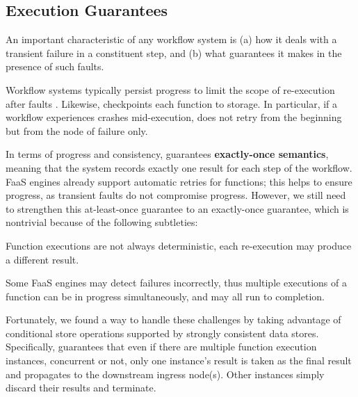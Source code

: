 \subsection{Execution Guarantees}\label{sec:exec-gntee}

An important characteristic of any workflow system is (a) how it deals with  a
transient failure in a constituent step, and (b) what guarantees it makes in
the presence of such faults.
 
Workflow systems typically persist progress to limit the scope of re-execution after faults
\cite{aws-step-functions, durable-functions, netherite, google-workflows, kappa}.
Likewise, \name{} checkpoints each function to storage.
 In particular, if a workflow experiences crashes mid-execution,
\name{} does not retry from the beginning but from the node of failure only.

In terms of progress and consistency, \name{} guarantees \textbf{exactly-once semantics}, 
meaning that the system records
exactly one result for each step of the workflow. FaaS engines already
support automatic retries for functions; this helps to ensure progress, as transient
faults do not compromise progress. However, we still need to
strengthen this at-least-once guarantee to an exactly-once guarantee, which 
is nontrivial because of the following subtleties:

\squishlist
	\item Function executions are not always deterministic, each re-execution
	may produce a different result.
	\item Some FaaS engines may detect failures incorrectly, thus multiple
	executions of a function can be in progress simultaneously, and may all run to completion.
\squishend
\vspace{1ex}

Fortunately, we found a way to handle these challenges by taking advantage of
conditional store operations supported by strongly consistent data stores.
Specifically, \name{} guarantees that even if there are multiple function
execution instances, concurrent or not, only one instance's result is taken as
the final result and propagates to the downstream ingress node(s). Other
instances simply discard their results and terminate.

